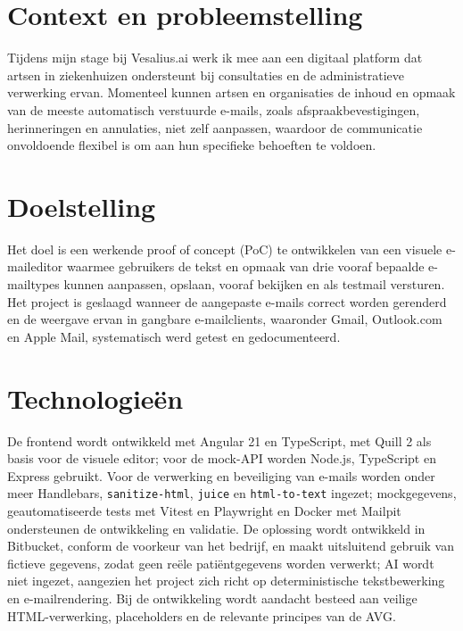 
\section{Context en probleemstelling}%
\label{vst:context}
Tijdens mijn stage bij Vesalius.ai werk ik mee aan een digitaal platform dat
artsen in ziekenhuizen ondersteunt bij consultaties en de administratieve
verwerking ervan. Momenteel kunnen artsen en organisaties de inhoud en opmaak
van de meeste automatisch verstuurde e-mails, zoals afspraakbevestigingen,
herinneringen en annulaties, niet zelf aanpassen, waardoor de communicatie
onvoldoende flexibel is om aan hun specifieke behoeften te voldoen.

\section{Doelstelling}%
\label{vst:doelstelling}
Het doel is een werkende proof of concept (PoC) te ontwikkelen van een visuele
e-maileditor waarmee gebruikers de tekst en opmaak van drie vooraf bepaalde
e-mailtypes kunnen aanpassen, opslaan, vooraf bekijken en als testmail
versturen. Het project is geslaagd wanneer de aangepaste e-mails correct worden
gerenderd en de weergave ervan in gangbare e-mailclients, waaronder Gmail,
Outlook.com en Apple Mail, systematisch werd getest en gedocumenteerd.

\section{Technologieën}%
\label{vst:technologieen}
De frontend wordt ontwikkeld met Angular 21 en TypeScript, met Quill 2 als
basis voor de visuele editor; voor de mock-API worden Node.js, TypeScript en
Express gebruikt. Voor de verwerking en beveiliging van e-mails worden onder
meer Handlebars, \texttt{sanitize-html}, \texttt{juice} en
\texttt{html-to-text} ingezet; mockgegevens, geautomatiseerde tests met Vitest
en Playwright en Docker met Mailpit ondersteunen de ontwikkeling en validatie.
De oplossing wordt ontwikkeld in Bitbucket, conform de voorkeur van het
bedrijf, en maakt uitsluitend gebruik van fictieve gegevens, zodat geen
reële patiëntgegevens worden verwerkt; AI wordt niet ingezet, aangezien het
project zich richt op deterministische tekstbewerking en e-mailrendering.
Bij de ontwikkeling wordt aandacht besteed aan veilige HTML-verwerking,
placeholders en de relevante principes van de AVG.

